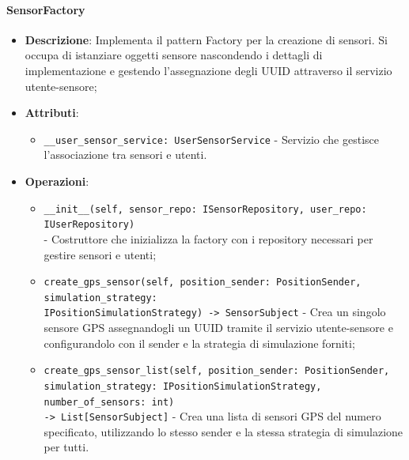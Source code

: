 \documentclass[10pt]{article}
\begin{document}
    \paragraph{SensorFactory}
    \begin{itemize} 
    \item \textbf{Descrizione}: Implementa il pattern Factory per la creazione di sensori. Si occupa di istanziare oggetti sensore nascondendo i dettagli di implementazione e gestendo l'assegnazione degli UUID attraverso il servizio utente-sensore;
    \item \textbf{Attributi}:
    \begin{itemize}
        \item \texttt{\_\_user\_sensor\_service: UserSensorService} - Servizio che gestisce l'associazione tra sensori e utenti.
    \end{itemize}
    
    \item \textbf{Operazioni}:
    \begin{itemize}
        \item \texttt{\_\_init\_\_(self, sensor\_repo: ISensorRepository, user\_repo: IUserRepository)}\\ - Costruttore che inizializza la factory con i repository necessari per gestire sensori e utenti;
        
        \item \texttt{create\_gps\_sensor(self, position\_sender: PositionSender, simulation\_strategy: \\IPositionSimulationStrategy) -> SensorSubject} - Crea un singolo sensore GPS assegnandogli un UUID tramite il servizio utente-sensore e configurandolo con il sender e la strategia di simulazione forniti;
        
        \item \texttt{create\_gps\_sensor\_list(self, position\_sender: PositionSender,\\ simulation\_strategy: IPositionSimulationStrategy, number\_of\_sensors: int)\\ -> List[SensorSubject]} - Crea una lista di sensori GPS del numero specificato, utilizzando lo stesso sender e la stessa strategia di simulazione per tutti.
    \end{itemize}
    \end{itemize}
\end{document}
